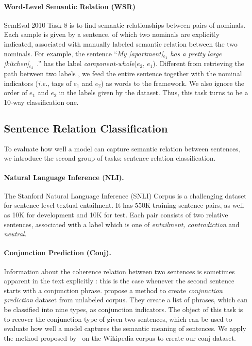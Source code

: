 \documentclass[11pt,a4paper]{article}
\begin{document}
\paragraph{Word-Level Semantic Relation (WSR)}
SemEval-2010 Task 8 \cite{hendrickx2009semeval} is to find semantic relationships between pairs of nominals.
Each sample is given by a sentence, of which two nominals are explicitly indicated, associated with manually labeled semantic relation between the two nominals.
For example, the sentence ``\textit{My [apartment]$_{e_1}$ has a pretty large [kitchen]$_{e_2}$ .}'' has the label \textit{component-whole}($e_2$, $e_1$).
Different from retrieving the path between two labels \cite{li2015tree,socher2013recursive}, we feed the entire sentence together with the nominal indicators (\textit{i.e.}, tags of $e_1$ and $e_2$) as words to the framework.
We also ignore the order of $e_1$ and $e_2$ in the labels given by the dataset.
Thus, this task turns to be a 10-way classification one. 

\subsection{Sentence Relation Classification}
To evaluate how well a model can capture semantic relation between sentences, we introduce the second group of tasks: sentence relation classification.
\paragraph{Natural Language Inference (NLI).}
The Stanford Natural Language Inference (SNLI) Corpus \cite{bowman2015large} is a challenging dataset for sentence-level textual entailment. 
It has 550K training sentence pairs, as well as 10K for development and 10K for test. 
Each pair consists of two relative sentences, associated with a label which is one of \textit{entailment, contradiction} and \textit{neutral}. 
\paragraph{Conjunction Prediction (Conj).}
Information about the coherence relation between two sentences is sometimes apparent in the text explicitly \cite{miltsakaki2004penn}: this is the case whenever the second sentence starts with a conjunction phrase.
 propose a method to create \textit{conjunction prediction} dataset from unlabeled corpus. 
They create a list of phrases, which can be classified into nine types, as conjunction indicators.
The object of this task is to recover the conjunction type of given two sentences, which can be used to evaluate how well a model captures the semantic meaning of sentences.
We apply the method proposed by~ on the Wikipedia corpus to create our conj dataset.
\end{document}
